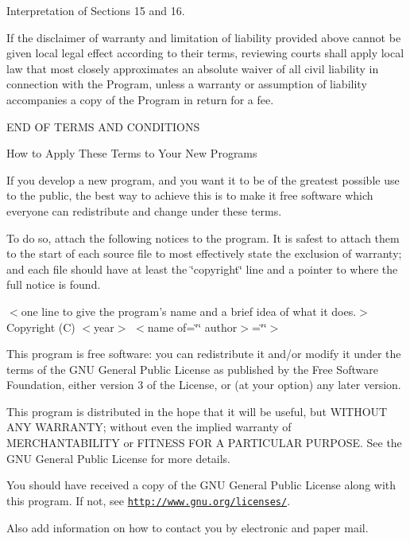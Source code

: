 \begin{DoxyEnumerate}
\item Interpretation of Sections 15 and 16.
\end{DoxyEnumerate}

If the disclaimer of warranty and limitation of liability provided above cannot be given local legal effect according to their terms, reviewing courts shall apply local law that most closely approximates an absolute waiver of all civil liability in connection with the Program, unless a warranty or assumption of liability accompanies a copy of the Program in return for a fee.

E\-N\-D O\-F T\-E\-R\-M\-S A\-N\-D C\-O\-N\-D\-I\-T\-I\-O\-N\-S

How to Apply These Terms to Your New Programs

If you develop a new program, and you want it to be of the greatest possible use to the public, the best way to achieve this is to make it free software which everyone can redistribute and change under these terms.

To do so, attach the following notices to the program. It is safest to attach them to the start of each source file to most effectively state the exclusion of warranty; and each file should have at least the \char`\"{}copyright\char`\"{} line and a pointer to where the full notice is found.

$<$one line to give the program's name and a brief idea of what it does.$>$ Copyright (C) $<$year$>$ $<$name of=\char`\"{}\char`\"{} author$>$=\char`\"{}\char`\"{}$>$

This program is free software\-: you can redistribute it and/or modify it under the terms of the G\-N\-U General Public License as published by the Free Software Foundation, either version 3 of the License, or (at your option) any later version.

This program is distributed in the hope that it will be useful, but W\-I\-T\-H\-O\-U\-T A\-N\-Y W\-A\-R\-R\-A\-N\-T\-Y; without even the implied warranty of M\-E\-R\-C\-H\-A\-N\-T\-A\-B\-I\-L\-I\-T\-Y or F\-I\-T\-N\-E\-S\-S F\-O\-R A P\-A\-R\-T\-I\-C\-U\-L\-A\-R P\-U\-R\-P\-O\-S\-E. See the G\-N\-U General Public License for more details.

You should have received a copy of the G\-N\-U General Public License along with this program. If not, see \href{http://www.gnu.org/licenses/}{\tt http\-://www.\-gnu.\-org/licenses/}.

Also add information on how to contact you by electronic and paper mail.

